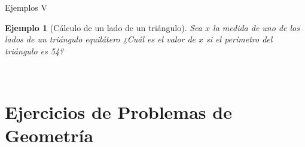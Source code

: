 \documentclass[9pt]{beamer}
\newcommand{\norma}[1]{\lVert #1 \rVert}
\newcommand{\mb}[2]{\mathbb{#1}^#2}
\newtheorem{Eje}{\textbf{Ejemplo}}[section]
\begin{document}
\begin{frame}{Ejemplos V}
\begin{Eje}[Cálculo de un lado de un triángulo]
Sea $x$ la medida de uno de los lados de un triángulo equilátero ¿Cuál es el valor de $x$ si el perímetro del triángulo es 54?
\end{Eje}
\begin{multicols}{2}
\textcolor{red}{
\\
}
\end{multicols}
\end{frame}
\section[Ejercicios Geometría]{Ejercicios  de Problemas de Geometría}
\end{document}
